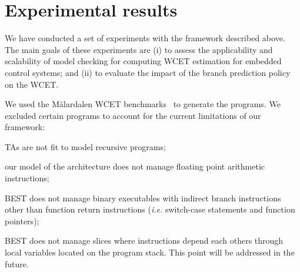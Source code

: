 \section{Experimental results}
\label{sec:results}

  We have conducted a set of experiments with the framework described above.
  The main goals of these experiments are (i) to assess the applicability and scalability of model checking for computing WCET estimation for embedded control systems; and (ii) to evaluate the impact of the branch prediction policy on the WCET.

  
  
  We used the Mälardalen WCET benchmarks~\cite{Gustafsson:WCET2010:Benchmarks}
  to generate the programs. We excluded certain programs to account for
  the current limitations of our framework: 
  \begin{enumerate*}[(i)]
    \item TAs are not fit to model recursive programs;
    \item our model of the architecture does not manage floating point
      arithmetic instructions;
    \item BEST does not manage binary executables with indirect branch
      instructions other than function return instructions (\textsl{i.e.} 
      switch-case statements and function pointers);
    \item BEST does not manage slices where instructions depend each others through local
      variables located on the program stack. This point will be addressed in
      the future.
  \end{enumerate*}

  

